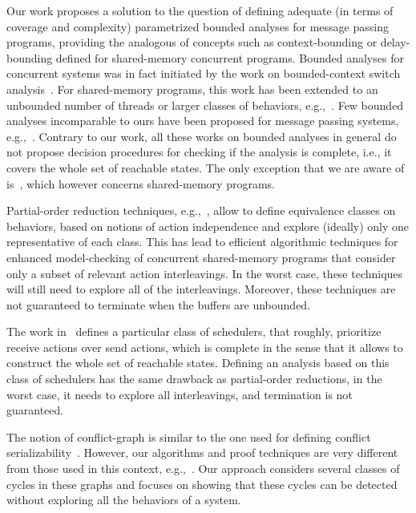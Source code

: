 Our work proposes a solution to the question of defining adequate (in terms of coverage and complexity) parametrized bounded analyses for message passing programs, providing the analogous of concepts such as context-bounding or delay-bounding defined for shared-memory concurrent programs. Bounded analyses for concurrent systems
was in fact initiated by the work on bounded-context switch analysis~\cite{DBLP:conf/pldi/QadeerW04,DBLP:conf/tacas/QadeerR05,DBLP:conf/cav/LalR08}. For shared-memory programs, this work has been extended to an unbounded number of threads or larger classes of behaviors, e.g.,~\cite{DBLP:conf/sas/BouajjaniEP11,DBLP:conf/popl/EmmiQR11,DBLP:conf/spin/KiddJV10,DBLP:conf/cav/TorreMP10}. Few bounded analyses incomparable to ours have been proposed for message passing systems, e.g.,~\cite{DBLP:conf/tacas/TorreMP08,DBLP:conf/tacas/BouajjaniE12}. Contrary to our work, all these works on bounded analyses in general do not propose decision procedures for checking if the analysis is complete, i.e., it covers the whole set of reachable states. The only exception that we are aware of is~\cite{DBLP:conf/cav/TorreMP10}, which however concerns shared-memory programs.  

Partial-order reduction techniques, e.g.,~\cite{DBLP:conf/popl/AbdullaAJS14,DBLP:conf/popl/FlanaganG05}, allow to define equivalence classes on behaviors, based on notions of action independence and explore (ideally) only one representative of each class. This has lead to efficient algorithmic techniques for enhanced model-checking of concurrent shared-memory programs that consider only a subset of relevant action interleavings. In the worst case, these techniques will still need to explore all of the interleavings. Moreover, these techniques are not guaranteed to terminate when the buffers are unbounded.

The work in~\cite{DBLP:conf/oopsla/Desai0M14} defines a particular class of schedulers, that roughly, prioritize receive actions over send actions, which is complete in the sense that it allows to construct the whole set of reachable states. Defining an analysis based on this class of schedulers has the same drawback as partial-order reductions, in the worst case, it needs to explore all interleavings, and termination is not guaranteed. 

The notion of conflict-graph is similar to the one used for defining conflict serializability~\cite{journals/jacm/Papadimitriou79b}. However, our algorithms and proof techniques are very different from those used in this context, e.g.,~\cite{DBLP:journals/iandc/AlurMP00,DBLP:conf/esop/BouajjaniEEH13,DBLP:conf/cav/FarzanM08}. Our approach considers several classes of cycles in these graphs and focuses on showing that these cycles can be detected without exploring all the behaviors of a system.

